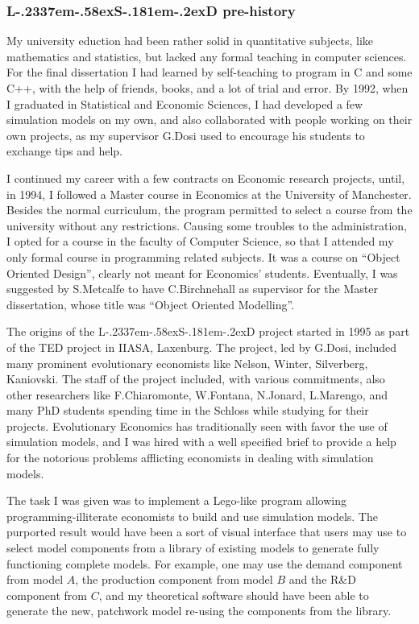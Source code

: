 \documentclass [11pt,a4paper] {book}
\def\LsD{{L\kern-.2337em\lower-.58ex\hbox{S}\kern-.181em\lower-.2ex\hbox{D}}\xspace}
\begin{document}
\subsubsection{\LsD pre-history}

My university eduction had been rather solid in quantitative subjects, like mathematics and statistics, but lacked any formal teaching in computer sciences. For the final dissertation I had learned by self-teaching to program in C and some C++, with the help of friends, books, and a lot of trial and error. By 1992, when I graduated in Statistical and Economic Sciences, I had developed a few simulation models on my own, and also collaborated with people working on their own projects, as my supervisor G.Dosi used to encourage his students to exchange tips and help.

I continued my career with a few contracts on Economic research projects, until, in 1994, I followed a Master course in Economics at the University of Manchester. Besides the normal curriculum, the program permitted to select a course from the university without any restrictions. Causing some troubles to the administration, I opted for a course in the faculty of Computer Science, so that I attended my only formal course in programming related subjects. It was a course on ``Object Oriented Design'', clearly not meant for Economics' students. Eventually, I was suggested by S.Metcalfe to have C.Birchnehall as supervisor for the Master dissertation, whose title was ``Object Oriented Modelling''. 

The origins of the \LsD project started in 1995 as part of the TED project in IIASA, Laxenburg. The project, led by G.Dosi, included many prominent evolutionary economists like Nelson, Winter, Silverberg, Kaniovski. The staff of the project included, with various commitments, also other researchers like F.Chiaromonte, W.Fontana, N.Jonard, L.Marengo, and many PhD students spending time in the Schloss while studying for their projects. Evolutionary Economics has traditionally seen with favor the use of simulation models, and I was hired with a well specified brief to provide a help for the notorious problems afflicting economists in dealing with simulation models.

The task I was given was to implement a Lego-like program allowing programming-illiterate economists to build and use simulation models. The purported result would have been a sort of visual interface that users may use to select model components from a library of existing models to generate fully functioning complete models. For example, one may use the demand component from model $A$, the production component from model $B$ and the R\&D component from $C$, and my theoretical software should have been able to generate the new, patchwork model re-using the components from the library.
\end{document}
